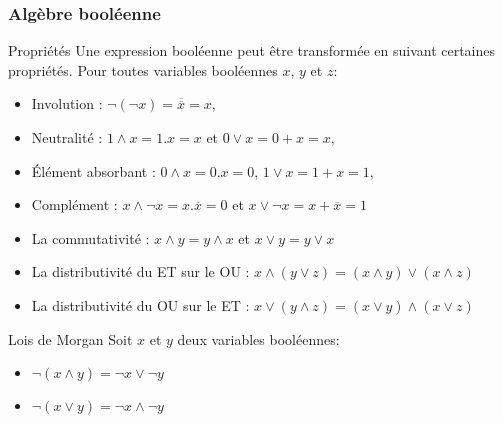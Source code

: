 \documentclass[9pt]{beamer}
\begin{document}
\begin{frame}
\frametitle{Algèbre booléenne}

\begin{block}{Propriétés}
Une expression booléenne peut être transformée en suivant certaines propriétés. Pour toutes variables booléennes $x$, $y$ et $z$: 
\begin{itemize}
\item Involution : $\neg(\neg x)=\overline{\overline{x}}=x$, 
\item Neutralité : $1 \wedge x=1.x=x$ et $0 \vee x=0+x=x$, 
\item Élément absorbant : $0 \wedge x=0.x=0$, $1 \vee x=1+x=1$, 
\item Complément : $x \wedge \neg x = x.\overline{x} = 0$ et $x \vee \neg x = x + \overline{x} =1$ 
\item La commutativité : $x \wedge y = y \wedge x$ et $x \vee y = y \vee x$
\item La distributivité du ET sur le OU : $x \wedge (y \vee z)= (x \wedge y) \vee (x \wedge z)$
\item La distributivité du OU sur le ET : $x \vee (y \wedge z)= (x \vee y) \wedge (x \vee z)$
\end{itemize}
\end{block}

\begin{block}{Lois de Morgan}
Soit $x$ et $y$ deux variables booléennes:
\begin{itemize}
\item $\neg(x \wedge y) = \neg x \vee \neg y$
\item $\neg(x \vee y) = \neg x \wedge \neg y$
\end{itemize}
\end{block}

\end{frame}
\end{document}
